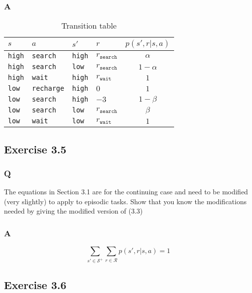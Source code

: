 \subsubsection{A}
\begin{table}[h!]
\centering
\begin{tabular}{ll|ll|c}
    $s$ & $a$ & $s'$ & $r$ & $p(s', r | s, a)$ \\
    \hline
     \texttt{high}& \texttt{search}&  \texttt{high}&  $r_{\texttt{search}}$& $\alpha$  \\
     \texttt{high}& \texttt{search}&  \texttt{low}&   $r_{\texttt{search}}$& $1 - \alpha$ \\
     \texttt{high}& \texttt{wait}&  \texttt{high}&   $r_{\texttt{wait}}$&  $1$ \\
     \texttt{low}& \texttt{recharge}&   \texttt{high}&    $0$&   $1$\\
     \texttt{low}& \texttt{search}&  \texttt{high}&  $-3$& $1 - \beta$  \\
     \texttt{low}& \texttt{search}&  \texttt{low}&   $r_{\texttt{search}}$& $\beta $\\
     \texttt{low}& \texttt{wait}&  \texttt{low}&   $r_{\texttt{wait}}$&  $1$
\end{tabular}


\caption{Transition table}
\label{table:3.4}
\end{table}


\subsection{Exercise 3.5}
\subsubsection{Q}
The equations in Section 3.1 are for the continuing case and need to be modified (very slightly) to apply to episodic tasks. Show that you know the modifications needed by giving the modified version of (3.3)

\subsubsection{A}
\begin{equation}
    \sum_{s' \in \mathcal{S}^{+}} \sum_{r \in \mathcal{R}} p(s', r | s, a) = 1
\end{equation}


\subsection{Exercise 3.6}

